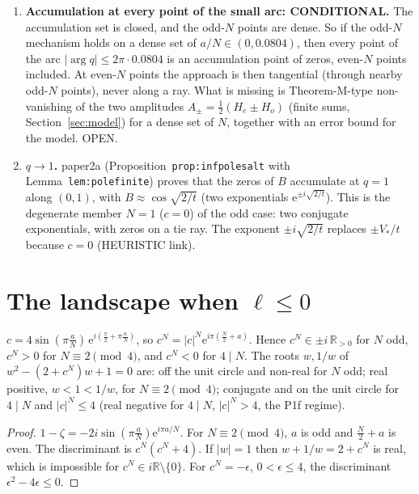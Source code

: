 \documentclass[11pt]{article}
\theoremstyle{remark}\newtheorem{remark}[theorem]{Remark}
\newcommand{\e}{\mathrm{e}}
\begin{document}
\begin{enumerate}
\begin{itemize}
\end{itemize}
\item[(C)] \textbf{Accumulation at every point of the small arc: CONDITIONAL.} The accumulation set is closed, and the odd-$N$ points are
dense. So if the odd-$N$ mechanism holds on a dense set of $a/N\in(0,0.0804)$, then every point of the arc
$|\arg q|\le2\pi\cdot0.0804$ is an accumulation point of zeros, even-$N$ points included. At even-$N$ points the approach is then
tangential (through nearby odd-$N$ points), never along a ray. What is missing is Theorem-M-type non-vanishing
of the two amplitudes $A_\pm=\frac12(H_e\pm H_o)$ (finite sums, Section~\ref{sec:model}) for a dense set of $N$, together with an
error bound for the model. OPEN.
\item[(D)] \textbf{$q\to1$.} paper2a (Proposition~\texttt{prop:infpolesalt} with Lemma~\texttt{lem:polefinite}) proves that the zeros of $B$
accumulate at $q=1$ along $(0,1)$, with $B\approx\cos\sqrt{2/t}$ (two exponentials $\e^{\pm i\sqrt{2/t}}$). This is the degenerate member $N=1$
($c=0$) of the odd case: two conjugate exponentials, with zeros on a tie ray. The exponent $\pm i\sqrt{2/t}$ replaces $\pm V_*/t$ because
$c=0$ (HEURISTIC link).
\end{enumerate}

\section{The landscape when $\ell\le0$}

\begin{lemma}\label{lem:roots}
$c=4\sin(\pi\frac aN)\,\e^{i(\frac\pi2+\pi\frac aN)}$, so $c^N=|c|^N\e^{i\pi(\frac N2+a)}$. Hence $c^N\in\pm i\,\mathbb R_{>0}$ for $N$ odd,
$c^N>0$ for $N\equiv2\pmod 4$, and $c^N<0$ for $4\mid N$. The roots $w,1/w$ of $w^2-(2+c^N)w+1=0$ are: off the unit circle and
non-real for $N$ odd; real positive, $w<1<1/w$, for $N\equiv2\pmod4$; conjugate and on the unit circle for $4\mid N$ and $|c|^N\le4$
(real negative for $4\mid N$, $|c|^N>4$, the P1f regime).
\end{lemma}
\begin{proof}
$1-\zeta=-2i\sin(\pi\frac aN)\e^{i\pi a/N}$. For $N\equiv2\pmod4$, $a$ is odd and $\frac N2+a$ is even. The discriminant is
$c^N(c^N+4)$. If $|w|=1$ then $w+1/w=2+c^N$ is real, which is impossible for $c^N\in i\mathbb R\setminus\{0\}$. For $c^N=-\epsilon$,
$0<\epsilon\le4$, the discriminant $\epsilon^2-4\epsilon\le0$.
\end{proof}
\end{document}
